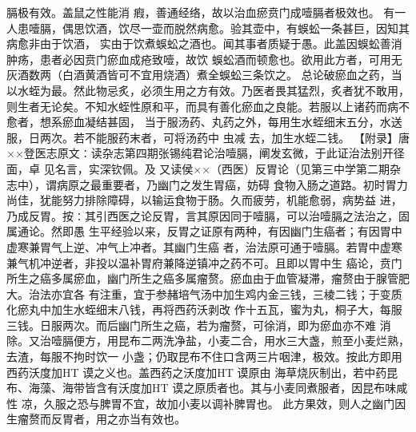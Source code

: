\documentclass[a4paper,12pt,UTF8,twoside]{ctexbook}
\begin{document}
膈极有效。盖鼠之性能消 瘕，善通经络，故以治血瘀贲门成噎膈者极效也。 
有一人患噎膈，偶思饮酒，饮尽一壶而脱然病愈。验其壶中，有蜈蚣一条甚巨，因知其病愈非由于饮酒， 
实由于饮煮蜈蚣之酒也。闻其事者质疑于愚。此盖因蜈蚣善消肿疡，患者必因贲门瘀血成疮致噎，故饮 
蜈蚣酒而顿愈也。欲用此方者，可用无灰酒数两（白酒黄酒皆可不宜用烧酒）煮全蜈蚣三条饮之。 
总论破瘀血之药，当以水蛭为最。然此物忌炙，必须生用之方有效。乃医者畏其猛烈，炙者犹不敢用， 
则生者无论矣。不知水蛭性原和平，而具有善化瘀血之良能。若服以上诸药而病不愈者，想系瘀血凝结甚固， 
当于服汤药、丸药之外，每用生水蛭细末五分，水送服，日两次。若不能服药末者，可将汤药中 虫减 
去，加生水蛭二钱。 
【附录】唐××登医志原文∶读杂志第四期张锡纯君论治噎膈，阐发玄微，于此证治法别开径面，卓 
见名言，实深钦佩。及 
又读侯××（西医）反胃论（见第三中学第二期杂志中），谓病原之最重要者，乃幽门之发生胃癌，妨碍 
食物入肠之道路。初时胃力尚佳，犹能努力排除障碍，以输运食物于肠。久而疲劳，机能愈弱，病势益 
进，乃成反胃。按∶其引西医之论反胃，言其原因同于噎膈，可以治噎膈之法治之，固属通论。然即愚 
生平经验以来，反胃之证原有两种，有因幽门生癌者；有因胃中虚寒兼胃气上逆、冲气上冲者。其幽门生癌 
者，治法原可通于噎膈。若胃中虚寒兼气机冲逆者，非投以温补胃府兼降逆镇冲之药不可。且即以胃中生 
癌论，贲门所生之癌多属瘀血，幽门所生之癌多属瘤赘。瘀血由于血管凝滞，瘤赘由于腺管肥大。治法亦宜各 
有注重，宜于参赭培气汤中加生鸡内金三钱，三棱二钱；于变质化瘀丸中加生水蛭细末八钱，再将西药沃剥改 
作十五瓦，蜜为丸，桐子大，每服三钱。日服两次。而后幽门所生之癌，若为瘤赘，可徐消，即为瘀血亦不难 
消除。又治噎膈便方，用昆布二两洗净盐，小麦二合，用水三大盏，煎至小麦烂熟，去渣，每服不拘时饮一 
小盏；仍取昆布不住口含两三片咽津，极效。按此方即用西药沃度加HT 谟之义也。盖西药之沃度加HT 谟原由 
海草烧灰制出，若中药昆布、海藻、海带皆含有沃度加HT 谟之原质者也。其与小麦同煮服者，因昆布味咸性 
凉，久服之恐与脾胃不宜，故加小麦以调补脾胃也。 
此方果效，则人之幽门因生瘤赘而反胃者，用之亦当有效也。 
\end{document}
